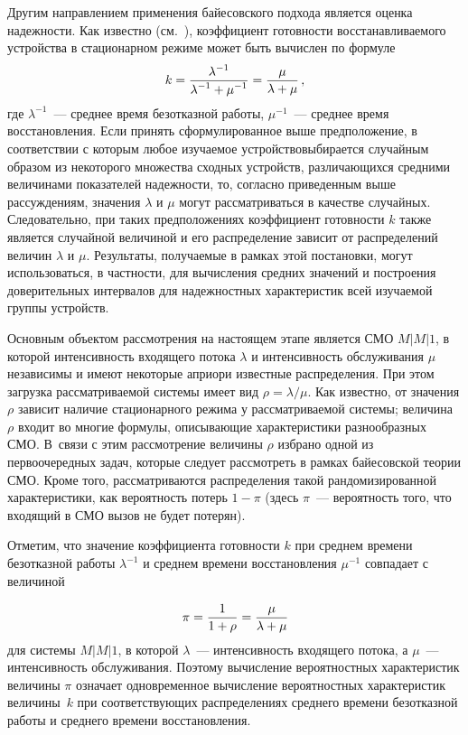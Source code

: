 \begin{multicols}{2}
Другим направлением применения байесовского подхода является оценка надежности. Как известно (см.~\cite{3k}), коэффициент
готовности восстанавливаемого устройства в стационарном режиме может быть вычислен по формуле
$$
k=\displaystyle\frac{\displaystyle \lambda^{-1}\mathstrut}{\displaystyle {\lambda^{-1}+\mu^{-1}}\mathstrut}=\displaystyle\frac{\displaystyle \mu\mathstrut}{\displaystyle {\lambda+\mu}\mathstrut}\,,
$$
где $\lambda^{-1}$~--- среднее время безотказной работы, $\mu^{-1}$~--- среднее время восстановления. Если принять
сформулированное выше предположение, в соответствии с которым любое изучаемое устройство\linebreak выбирается случайным образом
из некоторого множества сходных устройств, различающихся сред\-ними величинами показателей надежности, то,\linebreak
 согласно
приведенным выше рассуждениям, значения $\lambda$ и $\mu$ могут рассматриваться в качестве случайных.
Следовательно, при таких предположениях коэффициент готовности $k$ также является случайной величиной и его
распределение зависит от распределений величин $\lambda$ и $\mu$. Результаты, получаемые в рамках этой постановки,
могут использоваться, в частности, для вычисления средних значений и построения доверительных интервалов для
надежностных характеристик всей изучаемой группы устройств.

Основным объектом рассмотрения на настоящем этапе является СМО  $M\vert M\vert 1$, в которой
интенсивность входящего потока $\lambda$ и интенсивность обслуживания $\mu$ независимы и имеют некоторые априори
известные распределения. При этом загрузка рассматриваемой системы имеет вид $\rho=\lambda/\mu$. Как известно, от
значения $\rho$ зависит наличие стационарного режима у рассматриваемой системы; величина $\rho$ входит во многие
формулы, описывающие характеристики разнообразных СМО. В~связи с этим рассмотрение величины $\rho$ избрано одной из
первоочередных задач, которые следует рассмотреть в рамках байесовской теории СМО. Кроме того, рассматриваются
распределения такой рандомизированной характеристики, как вероятность потерь $1-\pi$ (здесь $\pi$~--- вероятность того,
что входящий в СМО вызов не будет потерян).

Отметим, что значение коэффициента го\-тов\-ности $k$ при среднем времени безотказной работы $\lambda^{-1}$ и среднем
времени восстановления $\mu^{-1}$ совпадает с величиной

\noindent
$$
\pi=\displaystyle\frac{\displaystyle 1\mathstrut}{\displaystyle {1+\rho}\mathstrut}=\displaystyle\frac{\displaystyle \mu\mathstrut}{\displaystyle {\lambda+\mu}\mathstrut}
$$
для системы $M\vert M\vert 1$, в которой $\lambda$~--- интенсивность входящего потока, а  $\mu$~--- интенсивность обслуживания.
Поэтому вычисление вероятностных характеристик величины $\pi$ означает одновременное вычисление вероятностных
характеристик величины~$k$ при соответствующих распределениях среднего времени безотказной работы и среднего времени
восстановления.


\end{multicols}
